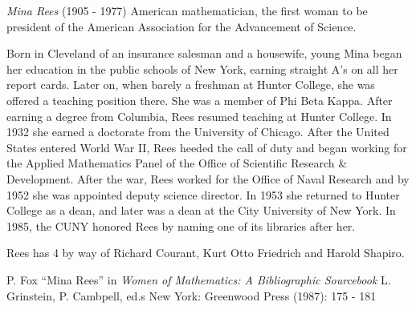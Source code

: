 \documentclass[12pt]{article}
\begin{document}

\emph{Mina Rees} (1905 - 1977) American mathematician, the first woman to be president of the American Association for the Advancement of Science.

Born in Cleveland of an insurance salesman and a housewife, young Mina began her education in the public schools of New York, earning straight A's on all her report cards. Later on, when barely a freshman at Hunter College, she was offered a teaching position there. She was a member of Phi Beta Kappa. After earning a degree from Columbia, Rees resumed teaching at Hunter College. In 1932 she earned a doctorate from the University of Chicago. After the United States entered World War II, Rees heeded the call of duty and began working for the Applied Mathematics Panel of the Office of Scientific Research \& Development. After the war, Rees worked for the Office of Naval Research and by 1952 she was appointed deputy science director. In 1953 she returned to Hunter College as a dean, and later was a dean at the City University of New York. In 1985, the CUNY honored Rees by naming one of its libraries after her.

Rees has  4 by way of Richard Courant, Kurt Otto Friedrich and Harold Shapiro.

\begin{thebibliography}{1}
 P. Fox ``Mina Rees'' in {\it Women of Mathematics: A Bibliographic Sourcebook} L. Grinstein, P. Cambpell, ed.s New York: Greenwood Press (1987): 175 - 181
\end{thebibliography}

\end{document}

